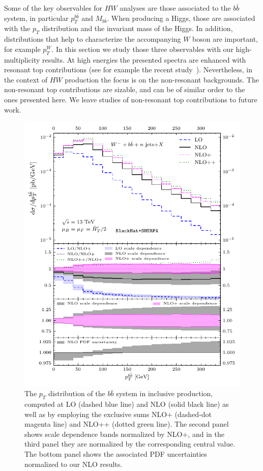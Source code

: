 Some of the key observables for $HW$ analyses are those associated to the $b\bar
b$ system, in particular $p_T^{b\bar b}$ and $M_{b\bar b}$. When
producing a Higgs, those are associated with the $p_T$ distribution
and the invariant mass of the Higgs. In addition,
distributions that help to characterize the accompanying $W$ boson are important, for
example $p_T^W$. In this section we study those three observables 
with our high-multiplicity results.
 At high energies the presented spectra are
enhanced with resonant top contributions (see for example the recent
study~\cite{Denner:2017kzu}). Nevertheless, in the context of $HW$ production
the focus is on the non-resonant backgrounds. The non-resonant top contributions
are sizable, and can be of similar order to the ones presented here. We leave
studies of non-resonant top contributions to future work.

\begin{figure}[ht]
  \centering
  \includegraphics[clip,scale=1]{plots/excl_ptbb_v4}
  \caption{The $p_T$ distribution of the $b\bar{b}$ system in inclusive \Wbbm{} production,
    computed at LO (dashed blue line) and NLO (solid black line) as well as
    by employing the exclusive sums NLO+ (dashed-dot magenta line)
    and NLO++ (dotted green line).
    The second panel shows scale dependence bands normalized by NLO+,
    and in the third panel they are normalized by the corresponding
    central value. The bottom panel shows the associated PDF uncertainties
    normalized to our NLO results.}
  \label{fig_Wmnjptbb}
\end{figure}

